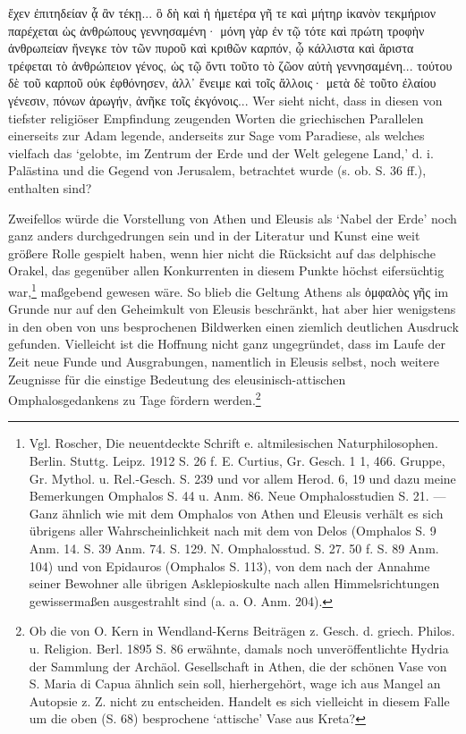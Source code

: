 \documentclass[a4paper, 11pt, oneside]{article}
\begin{document}
ἔχεν ἐπιτηδείαν ᾇ ἂν τέκῃ... ὃ δὴ καὶ ἡ ἡμετέρα γῆ τε καὶ μήτηρ ἱκανὸν τεκμήριον παρέχεται ὡς ἀνθρώπους γεννησαμένη· μόνη γὰρ ἐν τῷ τότε καὶ πρώτη τροφὴν ἀνθρωπείαν ἤνεγκε τὸν τῶν πυροῦ καὶ κριθῶν καρπόν, ᾧ κάλλιστα καὶ ἄριστα τρέφεται τὸ ἀνθρώπειον γένος, ὡς τῷ ὄντι τοῦτο τὸ ζῶον αὐτὴ γεννησαμένη... τούτου δὲ τοῦ καρποῦ οὐκ ἐφθόνησεν, ἀλλ᾽ ἔνειμε καὶ τοῖς ἄλλοις· μετὰ δὲ τοῦτο ἐλαίου γένεσιν, πόνων ἀρωγήν, ἀνῆκε τοῖς ἐκγόνοις... Wer sieht nicht, dass in diesen von tiefster religiöser Empfindung zeugenden Worten die griechischen Parallelen einerseits zur Adam legende, anderseits zur Sage vom Paradiese, als welches vielfach das `gelobte, im Zentrum der Erde und der Welt gelegene Land,' d. i. Palästina und die Gegend von Jerusalem, betrachtet wurde (s. ob. S. 36 ff.), enthalten sind?

Zweifellos würde die Vorstellung von Athen und Eleusis als `Nabel der Erde' noch ganz anders durchgedrungen sein und in der Literatur und Kunst eine weit größere Rolle gespielt haben, wenn hier nicht die Rücksicht auf das delphische Orakel, das gegenüber allen Konkurrenten in diesem Punkte höchst eifersüchtig war,\footnote{Vgl. Roscher, Die neuentdeckte Schrift e. altmilesischen Naturphilosophen. Berlin. Stuttg. Leipz. 1912 S. 26 f. E. Curtius, Gr. Gesch. 1 1, 466. Gruppe, Gr. Mythol. u. Rel.-Gesch. S. 239 und vor allem Herod. 6, 19 und dazu meine Bemerkungen Omphalos S. 44 u. Anm. 86. Neue Omphalosstudien S. 21. --- Ganz ähnlich wie mit dem Omphalos von Athen und Eleusis verhält es sich übrigens aller Wahrscheinlichkeit nach mit dem von Delos (Omphalos S. 9 Anm. 14. S. 39 Anm. 74. S. 129. N. Omphalosstud. S. 27. 50 f. S. 89 Anm. 104) und von Epidauros (Omphalos S. 113), von dem nach der Annahme seiner Bewohner alle übrigen Asklepioskulte nach allen Himmelsrichtungen gewissermaßen ausgestrahlt sind (a. a. O. Anm. 204).} maßgebend gewesen wäre. So blieb die Geltung Athens als ὀμφαλὸς γῆς im Grunde nur auf den Geheimkult von Eleusis beschränkt, hat aber hier wenigstens in den oben von uns besprochenen Bildwerken einen ziemlich deutlichen Ausdruck gefunden. Vielleicht ist die Hoffnung nicht ganz ungegründet, dass im Laufe der Zeit neue Funde und Ausgrabungen, namentlich in Eleusis selbst, noch weitere Zeugnisse für die einstige Bedeutung des eleusinisch-attischen Omphalosgedankens zu Tage fördern werden.\footnote{Ob die von O. Kern in Wendland-Kerns Beiträgen z. Gesch. d. griech. Philos. u. Religion. Berl. 1895 S. 86 erwähnte, damals noch unveröffentlichte Hydria der Sammlung der Archäol. Gesellschaft in Athen, die der schönen Vase von S. Maria di Capua ähnlich sein soll, hierhergehört, wage ich aus Mangel an Autopsie z. Z. nicht zu entscheiden. Handelt es sich vielleicht in diesem Falle um die oben (S. 68) besprochene `attische' Vase aus Kreta?} 
\clearpage
\end{document}
